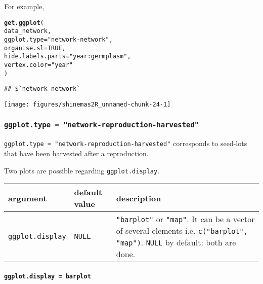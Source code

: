 \documentclass{article}\usepackage[]{graphicx}\usepackage[]{color}
\makeatletter
\def\maxwidth{ %
  \ifdim\Gin@nat@width>\linewidth
    \linewidth
  \else
    \Gin@nat@width
  \fi
}
\newcommand{\hlnum}[1]{\textcolor[rgb]{0.686,0.059,0.569}{#1}}%
\newcommand{\hlstr}[1]{\textcolor[rgb]{0.192,0.494,0.8}{#1}}%
\newcommand{\hlstd}[1]{\textcolor[rgb]{0.345,0.345,0.345}{#1}}%
\newcommand{\hlkwc}[1]{\textcolor[rgb]{0.333,0.667,0.333}{#1}}%
\newcommand{\hlkwd}[1]{\textcolor[rgb]{0.737,0.353,0.396}{\textbf{#1}}}%
\newenvironment{kframe}{%
 \def\at@end@of@kframe{}%
 \ifinner\ifhmode%
  \def\at@end@of@kframe{\end{minipage}}%
  \begin{minipage}{\columnwidth}%
 \fi\fi%
 \def\FrameCommand##1{\hskip\@totalleftmargin \hskip-\fboxsep
 \colorbox{shadecolor}{##1}\hskip-\fboxsep
     \hskip-\linewidth \hskip-\@totalleftmargin \hskip\columnwidth}%
 \MakeFramed {\advance\hsize-\width
   \@totalleftmargin\z@ \linewidth\hsize
   \@setminipage}}%
 {\par\unskip\endMakeFramed%
 \at@end@of@kframe}
\newenvironment{knitrout}{}{} %
\makeatother
\begin{document}
For example,

\begin{knitrout}
\color{fgcolor}\begin{kframe}
\begin{alltt}
\hlkwd{get.ggplot}\hlstd{(}
        \hlstd{data_network,}
        \hlkwc{ggplot.type} \hlstd{=} \hlstr{"network-network"}\hlstd{,}
        \hlkwc{organise.sl} \hlstd{=} \hlnum{TRUE}\hlstd{,}
        \hlkwc{hide.labels.parts} \hlstd{=} \hlstr{"year:germplasm"}\hlstd{,}
        \hlkwc{vertex.color} \hlstd{=} \hlstr{"year"}
        \hlstd{)}
\end{alltt}
\begin{verbatim}
## $`network-network`
\end{verbatim}
\end{kframe}


{\centering \texttt{[image: figures/shinemas2R\_unnamed-chunk-24-1]} 

}



\end{knitrout}

\subsubsection{\texttt{ggplot.type = "network-reproduction-harvested"}}


\texttt{ggplot.type = "network-reproduction-harvested"} corresponds to seed-lots that have been harvested after a reproduction.


Two plots are possible regarding \texttt{ggplot.display}.

\begin{center}
\begin{tabular}{ p{} p{} p{} }
\hline
argument & default value & description \\
\hline
\texttt{ggplot.display} & \texttt{NULL} & \texttt{"barplot"} or  \texttt{"map"}.
It can be a vector of several elements i.e. \texttt{c("barplot", "map")}. 
\texttt{NULL} by default: both are done. \\
\hline
\end{tabular}
\end{center}


\paragraph{\texttt{ggplot.display = barplot}}
\end{document}
